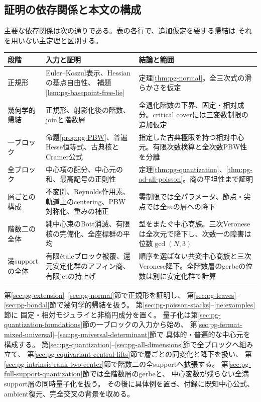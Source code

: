 \subsection*{証明の依存関係と本文の構成}
主要な依存関係は次の通りである。表の各行で、追加仮定を要する帰結は
それを用いない主定理と区別する。
\begin{center}
\small
\begin{tabular}{p{.14\linewidth}p{.36\linewidth}p{.38\linewidth}}
\toprule
段階 & 入力と証明 & 結論と範囲 \\
\midrule
正規形 & Euler--Koszul表示、Hessianの基点自由性、
補題\ref{lem:pg-basepoint-free-lie} &
定理\ref{thm:pg-normal}。全三次式の滑らかさを仮定 \\
幾何学的帰結 & 正規形、射影化後の階数、joinと階数層 &
全退化階数の下界、固定・相対成分。critical coverには三変数制限の追加仮定 \\
一ブロック & 命題\ref{prop:pg-PBW}、普遍Hesse恒等式、古典核とCramer公式 &
指定した古典極限を持つ相対中心元。有限次数検算と全次数PBW性を分離 \\
全ブロック & 中心項の配分、中心元の和、最高記号の正則性 &
定理\ref{thm:pg-quantization}、\ref{thm:pg-ad-all-poisson}。商の平坦性まで証明 \\
層ごとの構成 & 不変開、Reynolds作用素、軌道上のcentering、PBW対称化、重みの補正 &
零制限では全パラメータ、節点・尖点では全$m$の層への降下 \\
階数二の全体 & 純中心束のBott消滅、有限核の完備化、全座標群の平均 &
型をまたぐ中心商族。三次Veroneseは全次元で降下し、次数一の障害は位数$\gcd(N,3)$ \\
満supportの全体 & 有限\'etaleブロック被覆、還元安定化群のアフィン商、有限jetの持上げ &
順序を選ばない共変中心商族と三次Veronese降下。全階数層のgerbeの位数は別に安定化群で計算 \\
\bottomrule
\end{tabular}
\end{center}

第\ref{sec:pg-extension}--\ref{sec:pg-normal}節で正規形を証明し、
第\ref{sec:pg-leaves}--\ref{sec:pg-bondal}節で幾何学的帰結を扱う。
第\ref{sec:pg-poisson-stacks}--\ref{ne:examples}節に
固定・相対モジュライと非楕円成分を置く。
量子化は第\ref{sec:pg-quantization-foundations}節の一ブロックの入力から始め、
第\ref{sec:pg-fermat-mixed-universal}--\ref{sec:pg-universal-determinant}節で
具体的・普遍的な中心元を構成する。
第\ref{sec:pg-quantization}--\ref{sec:pg-all-dimensions}節で全ブロックへ組み立て、
第\ref{sec:pg-equivariant-central-lifts}節で層ごとの同変化と降下を扱い、
第\ref{sec:pg-intrinsic-rank-two-center}節で階数二の全supportへ拡張する。
第\ref{sec:pg-full-support-quantization}節では全階数層のgerbeと、
中心変数が残らない全満support層の同時量子化を扱う。
その後に具体例を置き、付録に既知中心公式、ambient復元、完全交叉の背景を収める。

